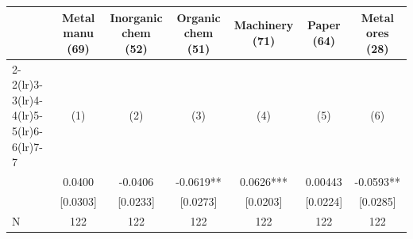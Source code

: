 {
\def\sym#1{\ifmmode^{#1}\else\(^{#1}\)\fi}
\begin{tabular}{l*{6}{c}}
\toprule
            &\multicolumn{1}{c}{Metal manu (69)}&\multicolumn{1}{c}{Inorganic chem (52)}&\multicolumn{1}{c}{Organic chem (51)}&\multicolumn{1}{c}{Machinery (71)}&\multicolumn{1}{c}{Paper (64)}&\multicolumn{1}{c}{Metal ores (28)}\\\cmidrule(lr){2-2}\cmidrule(lr){3-3}\cmidrule(lr){4-4}\cmidrule(lr){5-5}\cmidrule(lr){6-6}\cmidrule(lr){7-7}
            &\multicolumn{1}{c}{(1)}   &\multicolumn{1}{c}{(2)}   &\multicolumn{1}{c}{(3)}   &\multicolumn{1}{c}{(4)}   &\multicolumn{1}{c}{(5)}   &\multicolumn{1}{c}{(6)}   \\
\midrule
{}          &      0.0400   &     -0.0406   &     -0.0619** &      0.0626***&     0.00443   &     -0.0593** \\
            &    [0.0303]   &    [0.0233]   &    [0.0273]   &    [0.0203]   &    [0.0224]   &    [0.0285]   \\
\midrule
N           &         122   &         122   &         122   &         122   &         122   &         122   \\
\bottomrule
\end{tabular}
}
